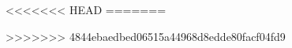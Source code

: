 \documentclass[11pt,paper=a4,final]{scrartcl}
\begin{document}
%
%
%

\newpage

\listoftables
<<<<<<< HEAD
=======
\listoffigures

>>>>>>> 4844ebaedbed06515a44968d8edde80facf04fd9
{}

\end{document}
